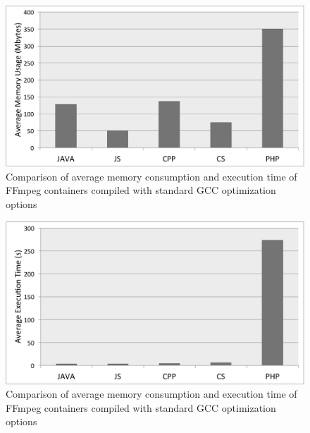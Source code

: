 \begin{figure}[h]
	\centering
	\includegraphics[width=1\linewidth]{Ressources/avgmem.pdf}
	\caption{Comparison of average memory consumption and execution time of FFmpeg containers compiled with standard GCC optimization options}
\end{figure}
\begin{figure}[h]
	\centering
	\includegraphics[width=1\linewidth]{Ressources/avgtime.pdf}
	\caption{Comparison of average memory consumption and execution time of FFmpeg containers compiled with standard GCC optimization options}
\end{figure}
\fi